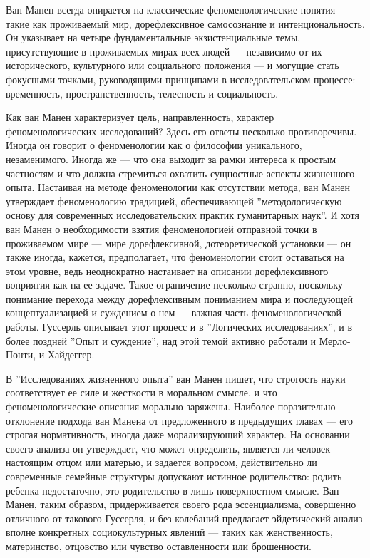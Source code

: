 \documentclass[11pt]{book}
\begin{document}
\begin{enumerate}
Ван Манен всегда опирается на классические феноменологические понятия --- такие как проживаемый мир, дорефлексивное самосознание и интенциональность. Он указывает на четыре фундаментальные экзистенциальные темы, присутствующие в проживаемых мирах всех людей --- независимо от их исторического, культурного или социального положения --- и могущие стать фокусными точками, руководящими принципами в исследовательском процессе: временность, пространственность, телесность и социальность.

Как ван Манен характеризует цель, направленность, характер феноменологических исследований? Здесь его ответы несколько противоречивы. Иногда он говорит о феноменологии как о философии уникального, незаменимого. Иногда же --- что она выходит за рамки интереса к простым частностям и что должна стремиться охватить сущностные аспекты жизненного опыта. Настаивая на методе феноменологии как отсутствии метода, ван Манен утверждает феноменологию традицией, обеспечивающей ''методологическую основу для современных исследовательских практик гуманитарных наук''. И хотя ван Манен о необходимости взятия феноменологией отправной точки в проживаемом мире --- мире дорефлексивной, дотеоретической установки --- он также иногда, кажется, предполагает, что феноменологии стоит оставаться на этом уровне, ведь неоднократно настаивает на описании дорефлексивного воприятия как на ее задаче. Такое ограничение несколько странно, поскольку понимание перехода между дорефлексивным пониманием мира и последующей концептуализацией и суждением о нем --- важная часть феноменологической работы. Гуссерль описывает этот процесс и в ''Логических исследованиях'', и в более поздней ''Опыт и суждение'', над этой темой активно работали и Мерло-Понти, и Хайдеггер.

В ''Исследованиях жизненного опыта'' ван Манен пишет, что строгость науки соответствует ее силе и жесткости в моральном смысле, и что феноменологические описания морально заряжены. Наиболее поразительно отклонение подхода ван Манена от предложенного в предыдущих главах --- его строгая нормативность, иногда даже морализирующий характер. На основании своего анализа он утверждает, что может определить, является ли человек настоящим отцом или матерью, и задается вопросом, действительно ли современные семейные структуры допускают истинное родительство: родить ребенка недостаточно, это родительство в лишь поверхностном смысле. Ван Манен, таким образом, придерживается своего рода эссенциализма, совершенно отличного от такового Гуссерля, и без колебаний предлагает эйдетический анализ вполне конкретных социокультурных явлений --- таких как женственность, материнство, отцовство или чувство оставленности или брошенности.


\end{enumerate}
\end{document}

